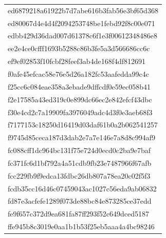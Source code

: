 \begin{tabular}{l}
ed6879218a61922b7d7abe616b3fab56e3bf65d368 \\
ed80067d4e4d4f2094253748be1febd92f8c00e071 \\
edbb429d36dad007d61378c6f1e3f00612348486e8 \\
ee2e4ce0cfff1693b5288c86b3fe5a3d566686cc6c \\
ef9ef02853f10fcbf28feef3ab4de168f4df812691 \\
f0afe45efcac58e76e5d26a182fc53aafedda99c4c \\
f25cc6c084eae358a3ebade9dffcdf0e59ec058b41 \\
f2e17585a43ed319c0e899dc66ec2e842efcf43dbc \\
f30e4cd2c7a19909fa3976049adc4d3f0e3aeb68f3 \\
f7177153c18250d16419d03daf61b0a2b062541257 \\
f9745d85ceca187d3dab2e7a7e146e7a8d8c994af9 \\
fc088cff1dc964bc131f75e724d0ecd0c2ba9e7baf \\
fc371fc6d1bf792a4a51cdb9fb23e7487966f67afb \\
fcc229fb9f9edca13fdbc26db807a78ea20c02f5f3 \\
fcdb35cc16d46c07459043ac1027c56eda9ab06832 \\
fd87e3acfefe1289f073de88bc84e873285ce37edd \\
fe9f657c372d9ea681fa87ff293f52c649dced5187 \\
ffe945b8c3019e0aa1b1b53f25eb5aaa4a4bc98246 \\
\bottomrule
\end{tabular}
